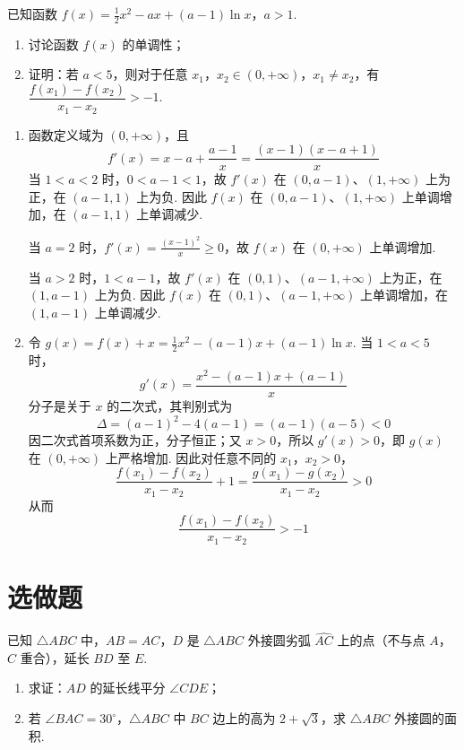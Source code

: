 \begin{problem}
已知函数 \(f(x) = \frac{1}{2}x^2 - ax + (a - 1)\ln x\)，\(a > 1\).
\begin{enumerate}
\item 讨论函数 \(f(x)\) 的单调性；
\item 证明：若 \(a < 5\)，则对于任意 \(x_{1}\)，\(x_{2} \in (0, +\infty)\)，\(x_{1} \neq x_{2}\)，有 \(\dfrac{f(x_{1}) - f(x_{2})}{x_{1} - x_{2}} > -1\).
\end{enumerate}
\end{problem}

\begin{solution}
\begin{enumerate}
\item 函数定义域为 \((0,+\infty)\)，且
\[
f'(x)=x-a+\frac{a-1}{x}=\frac{(x-1)(x-a+1)}{x}
\]
当 \(1<a<2\) 时，\(0<a-1<1\)，故 \(f'(x)\) 在 \((0,a-1)\)、\((1,+\infty)\) 上为正，在 \((a-1,1)\) 上为负. 因此 \(f(x)\) 在 \((0,a-1)\)、\((1,+\infty)\) 上单调增加，在 \((a-1,1)\) 上单调减少.

当 \(a=2\) 时，\(f'(x)=\frac{(x-1)^2}{x}\geqslant0\)，故 \(f(x)\) 在 \((0,+\infty)\) 上单调增加.

当 \(a>2\) 时，\(1<a-1\)，故 \(f'(x)\) 在 \((0,1)\)、\((a-1,+\infty)\) 上为正，在 \((1,a-1)\) 上为负. 因此 \(f(x)\) 在 \((0,1)\)、\((a-1,+\infty)\) 上单调增加，在 \((1,a-1)\) 上单调减少.
\item 令 \(g(x)=f(x)+x=\frac12x^2-(a-1)x+(a-1)\ln x\). 当 \(1<a<5\) 时，
\[
g'(x)=\frac{x^2-(a-1)x+(a-1)}{x}
\]
分子是关于 \(x\) 的二次式，其判别式为
\[
\Delta=(a-1)^2-4(a-1)=(a-1)(a-5)<0
\]
因二次式首项系数为正，分子恒正；又 \(x>0\)，所以 \(g'(x)>0\)，即 \(g(x)\) 在 \((0,+\infty)\) 上严格增加. 因此对任意不同的 \(x_1\)，\(x_2>0\)，
\[
\frac{f(x_1)-f(x_2)}{x_1-x_2}+1=\frac{g(x_1)-g(x_2)}{x_1-x_2}>0
\]
从而
\[
\frac{f(x_1)-f(x_2)}{x_1-x_2}>-1
\]
\end{enumerate}
\end{solution}

\section{选做题}

\begin{problem}
已知 \(\triangle ABC\) 中，\(AB = AC\)，\(D\) 是 \(\triangle ABC\) 外接圆劣弧 \(\widehat{AC}\) 上的点（不与点 \(A\)，\(C\) 重合），延长 \(BD\) 至 \(E\).

\begin{enumerate}
\item 求证：\(AD\) 的延长线平分 \(\angle CDE\)；
\item 若 \(\angle BAC = 30^{\circ}\)，\(\triangle ABC\) 中 \(BC\) 边上的高为 \(2 + \sqrt{3}\)，求 \(\triangle ABC\) 外接圆的面积.
\end{enumerate}

\end{problem}

